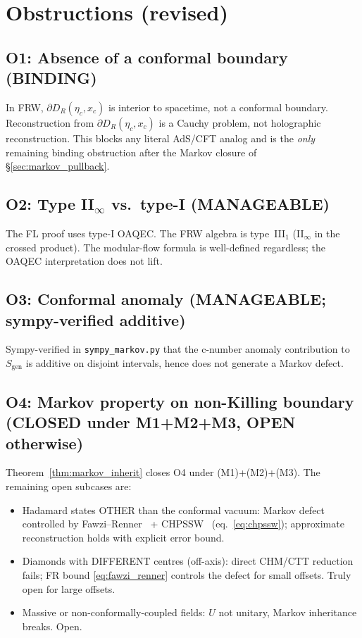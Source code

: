 \documentclass[11pt,a4paper]{article}
\theoremstyle{remark}
\newcommand{\Sgen}{S_{\mathrm{gen}}}
\newcommand{\DR}{D_R(\eta_c,x_c)}
\begin{document}
\section{Obstructions (revised)}
\label{sec:obstructions}

\subsection{O1: Absence of a conformal boundary (BINDING)}

In FRW, $\partial\DR$ is interior to spacetime, not a conformal boundary.
Reconstruction from $\partial\DR$ is a Cauchy problem, not holographic
reconstruction.  This blocks any literal AdS/CFT analog and is the
\emph{only} remaining binding obstruction after the Markov closure of
\S\ref{sec:markov_pullback}.

\subsection{O2: Type II$_\infty$ vs.\ type-I (MANAGEABLE)}

The FL proof uses type-I OAQEC.  The FRW algebra is type~III$_1$
(II$_\infty$ in the crossed product).  The modular-flow formula is
well-defined regardless; the OAQEC interpretation does not lift.

\subsection{O3: Conformal anomaly (MANAGEABLE; sympy-verified additive)}

Sympy-verified in \texttt{sympy\_markov.py} that the c-number anomaly
contribution to $\Sgen$ is additive on disjoint intervals, hence does
not generate a Markov defect.

\subsection{O4: Markov property on non-Killing boundary
            (\textbf{CLOSED} under M1+M2+M3, OPEN otherwise)}
\label{subsec:O4_revised}

Theorem~\ref{thm:markov_inherit} closes O4 under (M1)+(M2)+(M3).  The
remaining open subcases are:

\begin{itemize}
\item[(O4a)] Hadamard states OTHER than the conformal vacuum: Markov
  defect controlled by Fawzi--Renner~\cite{FawziRenner2015} +
  CHPSSW~\cite{CHPSSW2017} (eq.~\eqref{eq:chpssw}); approximate
  reconstruction holds with explicit error bound.
\item[(O4b)] Diamonds with DIFFERENT centres (off-axis): direct
  CHM/CTT reduction fails; FR bound \eqref{eq:fawzi_renner} controls
  the defect for small offsets.  Truly open for large offsets.
\item[(O4c)] Massive or non-conformally-coupled fields: $U$ not
  unitary, Markov inheritance breaks.  Open.
\end{itemize}
\end{document}
